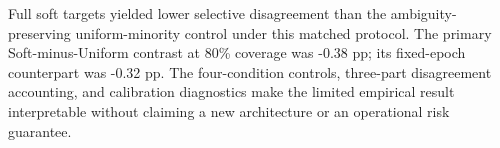 Full soft targets yielded lower selective disagreement than the ambiguity-preserving uniform-minority control under this matched protocol. The primary Soft-minus-Uniform contrast at 80\% coverage was -0.38 pp; its fixed-epoch counterpart was -0.32 pp. The four-condition controls, three-part disagreement accounting, and calibration diagnostics make the limited empirical result interpretable without claiming a new architecture or an operational risk guarantee.


